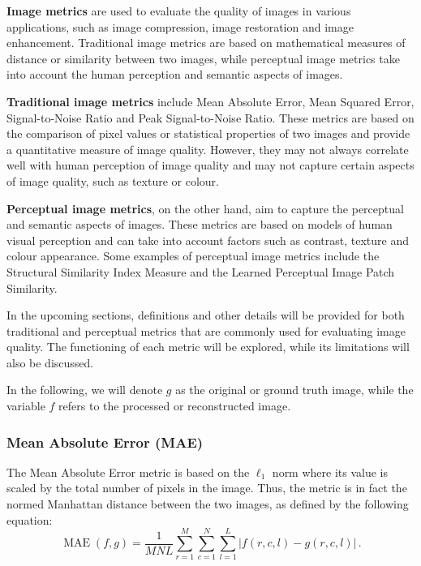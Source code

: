 
\textbf{Image metrics} are used to evaluate the quality of images in various applications, such as image compression, image restoration and image enhancement. Traditional image metrics are based on mathematical measures of distance or similarity between two images, while perceptual image metrics take into account the human perception and semantic aspects of images.

\textbf{Traditional image metrics} include Mean Absolute Error, Mean Squared Error, Signal-to-Noise Ratio and Peak Signal-to-Noise Ratio. These metrics are based on the comparison of pixel values or statistical properties of two images and provide a quantitative measure of image quality. However, they may not always correlate well with human perception of image quality and may not capture certain aspects of image quality, such as texture or colour.

\textbf{Perceptual image metrics}, on the other hand, aim to capture the perceptual and semantic aspects of images. These metrics are based on models of human visual perception and can take into account factors such as contrast, texture and colour appearance. Some examples of perceptual image metrics include the Structural Similarity Index Measure and the Learned Perceptual Image Patch Similarity.

In the upcoming sections, definitions and other details will be provided for both traditional and perceptual metrics that are commonly used for evaluating image quality. The functioning of each metric will be explored, while its limitations will also be discussed.

In the following, we will denote $g$ as the original or ground truth image, while the variable $f$ refers to the processed or reconstructed image.

\subsubsection*{Mean Absolute Error (MAE)}

The Mean Absolute Error metric is based on the $\ell_1$ norm where its value is scaled by the total number of pixels in the image. Thus, the metric is in fact the normed Manhattan distance between the two images, as defined by the following equation:
\begin{equation}
    \operatorname{MAE}(f, g) = \dfrac{1}{MNL} \sum\limits_{r=1}^{M}\sum\limits_{c=1}^{N}\sum\limits_{l=1}^{L} \left| f(r, c, l) - g(r, c, l) \right|\,.
\end{equation}
